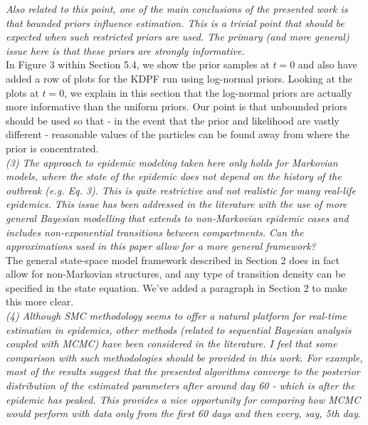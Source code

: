 \documentclass{article}
\begin{document}

\noindent \emph{Also related to this point, one of the main conclusions of the presented work is that bounded priors influence estimation. This is a trivial point that should be expected when such restricted priors are used. The primary (and more general) issue here is that these priors are strongly informative.} \\

In Figure 3 within Section 5.4, we show the prior samples at $t = 0$ and also have added a row of plots for the KDPF run using log-normal priors. Looking at the plots at $t = 0$, we explain in this section that the log-normal priors are actually more informative than the uniform priors. Our point is that unbounded priors should be used so that - in the event that the prior and likelihood are vastly different - reasonable values of the particles can be found away from where the prior is concentrated. \\

\noindent \emph{(3) The approach to epidemic modeling taken here only holds for Markovian models, where the state of the epidemic does not depend on the history of the outbreak (e.g. Eq. 3). This is quite restrictive and not realistic for many real-life epidemics. This issue has been addressed in the literature with the use of more general Bayesian modelling that extends to non-Markovian epidemic cases and includes non-exponential transitions between compartments. Can the approximations used in this paper allow for a more general framework?} \\

The general state-space model framework described in Section 2 does in fact allow for non-Markovian structures, and any type of transition density can be specified in the state equation. We've added a paragraph in Section 2 to make this more clear. \\

\noindent \emph{(4) Although SMC methodology seems to offer a natural platform for real-time estimation in epidemics, other methods (related to sequential Bayesian analysis coupled with MCMC) have been considered in the literature. I feel that some comparison with such methodologies should be provided in this work. For example, most of the results suggest that the presented algorithms converge to the posterior distribution of the estimated parameters after around day 60 - which is after the epidemic has peaked. This provides a nice opportunity for comparing how MCMC would perform with data only from the first 60 days and then every, say, 5th day.} \\
\end{document}
